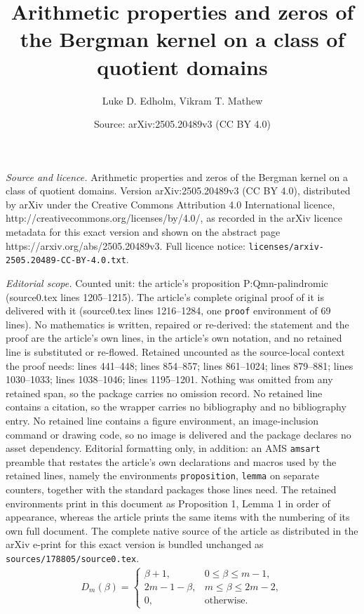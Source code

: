 \documentclass[10pt,a4paper]{amsart}
\title{Arithmetic properties and zeros of the Bergman kernel on a class of quotient domains}
\author{Luke D. Edholm, Vikram T. Mathew}
\date{Source: arXiv:2505.20489v3 (CC BY 4.0)}
\begin{document}
\maketitle

\noindent\emph{Source and licence.} Arithmetic properties and zeros of the Bergman kernel on a class of quotient domains. Version arXiv:2505.20489v3 (CC BY 4.0), distributed by arXiv under the Creative Commons Attribution 4.0 International licence, http://creativecommons.org/licenses/by/4.0/, as recorded in the arXiv licence metadata for this exact version and shown on the abstract page https://arxiv.org/abs/2505.20489v3. Full licence notice: \texttt{licenses/arxiv-2505.20489-CC-BY-4.0.txt}.\par\smallskip

\noindent\textit{Editorial scope.} Counted unit: the article's proposition P:Qmn-palindromic (source0.tex lines 1205--1215). The article's complete original proof of it is delivered with it (source0.tex lines 1216--1284, one \texttt{proof} environment of 69 lines). No mathematics is written, repaired or re-derived: the statement and the proof are the article's own lines, in the article's own notation, and no retained line is substituted or re-flowed.  Retained uncounted as the source-local context the proof needs: lines 441--448; lines 854--857; lines 861--1024; lines 879--881; lines 1030--1033; lines 1038--1046; lines 1195--1201.  Nothing was omitted from any retained span, so the package carries no omission record.  No retained line contains a citation, so the wrapper carries no bibliography and no bibliography entry.  No retained line contains a figure environment, an image-inclusion command or drawing code, so no image is delivered and the package declares no asset dependency.  Editorial formatting only, in addition: an AMS \texttt{amsart} preamble that restates the article's own declarations and macros used by the retained lines, namely the environments \texttt{proposition}, \texttt{lemma} on separate counters, together with the standard packages those lines need.  The retained environments print in this document as Proposition 1, Lemma 1 in order of appearance, whereas the article prints the same items with the numbering of its own full document.  The complete native source of the article as distributed in the arXiv e-print for this exact version is bundled unchanged as \texttt{sources/178805/source0.tex}.
\begin{align}\label{E:Dbasic_def}
D_m(\beta) 
= \begin{cases}
\beta + 1, & 0 \leq \beta \leq m - 1, \\
2m - 1 - \beta, & m \leq \beta \leq 2m - 2, \\
0, & \mathrm{otherwise}.
\end{cases}
\end{align}
\end{document}
